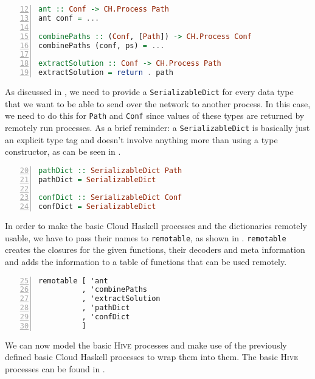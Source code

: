 \begin{lstlisting}[language=Haskell,frame=tb,numbers=left,firstnumber=12,label=lst:ant_basic,caption=Basic \textsf{Cloud Haskell} processes.]
ant :: Conf -> CH.Process Path
ant conf = ...

combinePaths :: (Conf, [Path]) -> CH.Process Conf
combinePaths (conf, ps) = ...

extractSolution :: Conf -> CH.Process Path
extractSolution = return . path
\end{lstlisting}

As discussed in , we need to provide a \texttt{SerializableDict} for every data type that we want to be able to send over the network to another process. In this case, we need to do this for \texttt{Path} and \texttt{Conf} since values of these types are returned by remotely run processes. As a brief reminder: a \texttt{SerializableDict} is basically just an explicit type tag and doesn't involve anything more than using a type constructor, as can be seen in .

\begin{lstlisting}[language=Haskell,frame=tb,numbers=left,firstnumber=20,label=lst:ant_dicts,caption=Dictionaries for serialisation.]
pathDict :: SerializableDict Path
pathDict = SerializableDict

confDict :: SerializableDict Conf
confDict = SerializableDict
\end{lstlisting}

In order to make the basic \textsf{Cloud Haskell} processes and the dictionaries remotely usable, we have to pass their names to \texttt{remotable}, as shown in . \texttt{remotable} creates the closures for the given functions, their decoders and meta information and adds the information to a table of functions that can be used remotely.

\begin{lstlisting}[language=Haskell,frame=tb,numbers=left,firstnumber=25,label=lst:ant_remotable,caption=Making processes and dictionaries remotable.]
remotable [ 'ant
          , 'combinePaths
          , 'extractSolution
          , 'pathDict
          , 'confDict
          ]
\end{lstlisting}

We can now model the basic \textsc{Hive} processes and make use of the previously defined basic \textsf{Cloud Haskell} processes to wrap them into them. The basic \textsc{Hive} processes can be found in .

